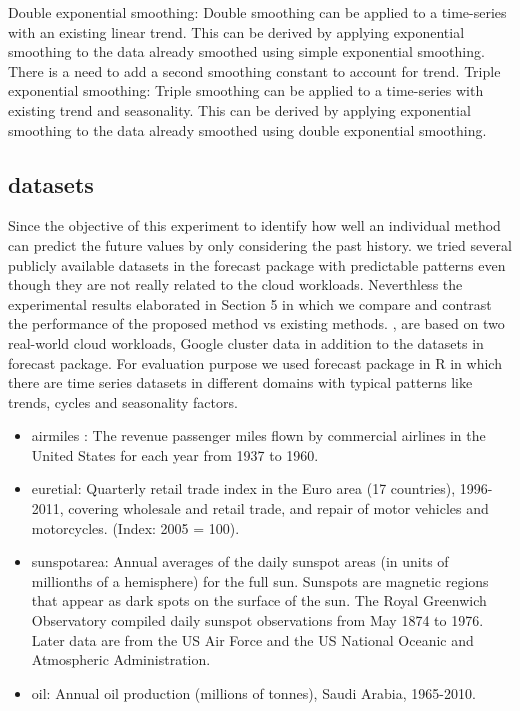 Double exponential smoothing: Double smoothing can be applied to a time-series with an existing linear trend. This can be derived by applying exponential smoothing to the data already smoothed using simple exponential smoothing. There is a need to add a second smoothing constant to account for trend.
Triple exponential smoothing: Triple smoothing can be applied to a time-series with existing trend and seasonality. This can be derived by applying exponential smoothing to the data already smoothed using double exponential smoothing.



\subsection{datasets}
Since the objective of this experiment to identify how well an individual method can predict the future values by only considering the past history. we tried several publicly available datasets in the forecast package with predictable patterns even though they are not really related to the cloud workloads. Neverthless the experimental results elaborated in Section 5 in which we  compare and contrast the performance of the proposed method vs existing methods. , are based on two real-world cloud workloads, Google cluster data  in addition to the datasets in forecast package. For evaluation purpose we used forecast package in R \cite{forecastPackage} in which there are time series datasets in different domains with typical patterns like trends, cycles and seasonality factors. 

\begin{itemize}
\item airmiles : The revenue passenger miles flown by commercial airlines in the United States for each year from 1937 to 1960.
\item euretial: Quarterly retail trade index in the Euro area (17 countries), 1996-2011, covering wholesale and retail trade, and repair of motor vehicles and motorcycles. (Index: 2005 = 100).
\item sunspotarea: Annual averages of the daily sunspot areas (in units of millionths of a hemisphere) for the full sun. Sunspots are magnetic regions that appear as dark spots on the surface of the sun. The Royal Greenwich Observatory compiled daily sunspot observations from May 1874 to 1976. Later data are from the US Air Force and the US National Oceanic and Atmospheric Administration.
\item oil: Annual oil production (millions of tonnes), Saudi Arabia, 1965-2010.
\end{itemize}



